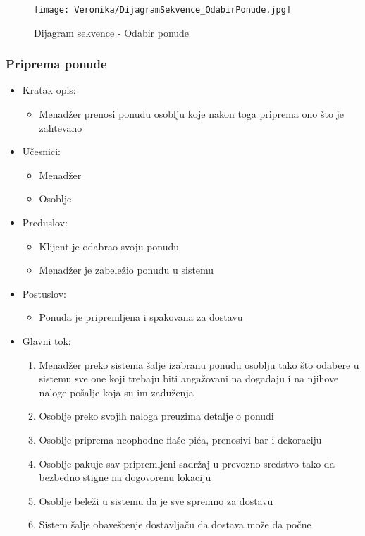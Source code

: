 \documentclass[a4paper]{article}
\begin{document}
\begin{figure}[H]
    \centering
    \texttt{[image: Veronika/DijagramSekvence\_OdabirPonude.jpg]}
    \caption{Dijagram sekvence - Odabir ponude}
    \label{fig:PrenosiviBar}
\end{figure}


\subsubsection{Priprema ponude}

\begin{itemize}
    \item Kratak opis:
        \begin{itemize}
            \item Menadžer prenosi ponudu osoblju koje nakon toga priprema ono što je zahtevano
        \end{itemize}
    \item Učesnici:
        \begin{itemize}
            \item Menadžer 
            \item Osoblje
        \end{itemize}
    \item Preduslov:
        \begin{itemize}
            \item Klijent je odabrao svoju ponudu
		    \item Menadžer je zabeležio ponudu u sistemu
        \end{itemize}
    \item Postuslov:
        \begin{itemize}
            \item Ponuda je pripremljena i spakovana za dostavu
        \end{itemize}
    \item Glavni tok:
        \begin{enumerate}
           \item Menadžer preko sistema šalje izabranu ponudu osoblju tako što odabere u sistemu sve one koji trebaju biti angažovani na događaju i na njihove naloge pošalje koja su im zaduženja
		   \item Osoblje preko svojih naloga preuzima detalje o ponudi
	       \item Osoblje priprema neophodne flaše pića, prenosivi bar i dekoraciju
	       \item Osoblje pakuje sav pripremljeni sadržaj u prevozno sredstvo tako da bezbedno stigne na dogovorenu lokaciju
	       \item Osoblje beleži u sistemu da je sve spremno za dostavu
	       \item Sistem šalje obaveštenje dostavljaču da dostava može da počne
        \end{enumerate}
\end{itemize}
\end{document}
